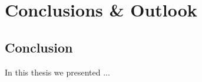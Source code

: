 \part{Conclusions \& Outlook}

\chapter{Conclusion}\label{cha:conclusion}

In this thesis we presented ... %


